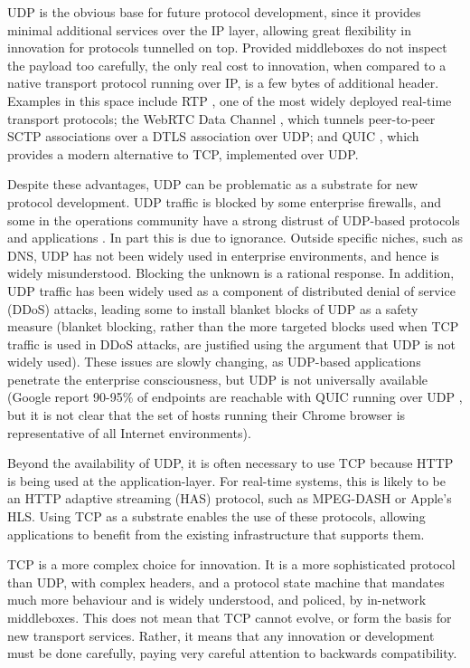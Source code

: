 \documentclass{sig-alternate-05-2015}
\begin{document}
UDP is the obvious base for future protocol development, since it provides
minimal additional services over the IP layer, allowing great flexibility
in innovation for protocols tunnelled on top. Provided middleboxes do not
inspect the payload too carefully, the only real cost to innovation, when
compared to a native transport protocol running over IP, is a few bytes of
additional header. Examples in this space include RTP \cite{rfc:3550}, one
of the most widely deployed real-time transport protocols; the WebRTC Data
Channel \cite{draft-ietf-rtcweb-data-channel-13}, which tunnels
peer-to-peer SCTP associations over a DTLS association over UDP; and QUIC
\cite{draft-tsvwg-quic-protocol-02}, which provides a modern alternative
to TCP, implemented over UDP.

Despite these advantages, UDP can be problematic as a substrate for new
protocol development. UDP traffic is blocked by some enterprise firewalls,
and some in the operations community have a strong distrust of UDP-based
protocols and applications \cite{draft-byrne-opsec-udp-advisory-00}. In
part this is due to ignorance. Outside specific niches, such as DNS, UDP
has not been widely used in enterprise environments, and hence is widely
misunderstood. Blocking the unknown is a rational response. In addition,
UDP traffic has been widely used as a component of distributed denial of
service (DDoS) attacks, leading some to install blanket blocks of UDP as
a safety measure (blanket blocking, rather than the more targeted blocks
used when TCP traffic is used in DDoS attacks, are justified using the
argument that UDP is not widely used).
These issues are slowly changing, as UDP-based applications penetrate the
enterprise consciousness, but UDP is not universally available
(Google report 90-95\% of endpoints are reachable with QUIC
running over UDP \cite{roskind2013quic}, but it is not clear that the set
of hosts running their Chrome browser is representative of all Internet
environments).

Beyond the availability of UDP, it is often necessary to use TCP because
HTTP is being used at the application-layer. For real-time systems, this
is likely to be an HTTP adaptive streaming (HAS) protocol, such as
MPEG-DASH or Apple's HLS. Using TCP as a substrate enables the use of these
protocols, allowing applications to benefit from the existing
infrastructure that supports them.

TCP is a more complex choice for innovation. It is a more sophisticated
protocol than UDP, with complex headers, and a protocol state machine
that mandates much more behaviour and is widely understood, and policed,
by in-network middleboxes. This does not mean that TCP cannot evolve, or
form the basis for new transport services. Rather, it means that any
innovation or development must be done carefully, paying very careful
attention to backwards compatibility.
\end{document}
